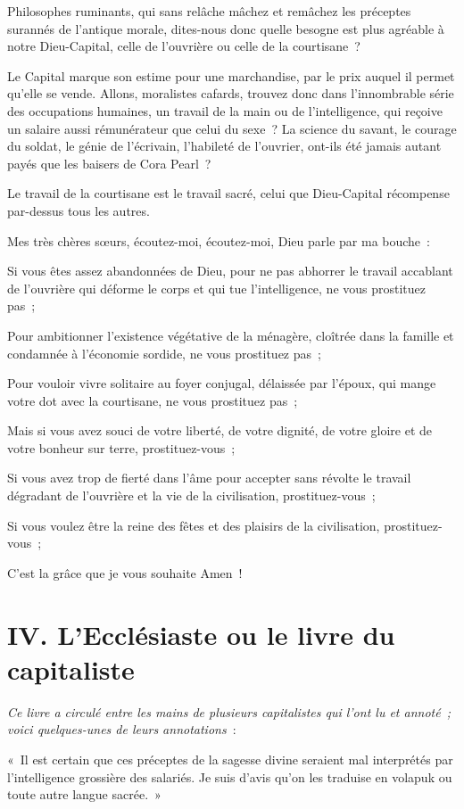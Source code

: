 \documentclass[french,twoside]{book} %
\begin{document}
Philosophes ruminants, qui sans relâche mâchez et remâchez les préceptes surannés de l’antique morale, dites-nous donc quelle besogne est plus agréable à notre Dieu-Capital, celle de l’ouvrière ou celle de la courtisane ?\par
Le Capital marque son estime pour une marchandise, par le prix auquel il permet qu’elle se vende. Allons, moralistes cafards, trouvez donc dans l’innombrable série des occupations humaines, un travail de la main ou de l’intelligence, qui reçoive un salaire aussi rémunérateur que celui du sexe ? La science du savant, le courage du soldat, le génie de l’écrivain, l’habileté de l’ouvrier, ont-ils été jamais autant payés que les baisers de Cora Pearl ?\par
Le travail de la courtisane est le travail sacré, celui que Dieu-Capital récompense par-dessus tous les autres.\par
Mes très chères sœurs, écoutez-moi, écoutez-moi, Dieu parle par ma bouche :\par
Si vous êtes assez abandonnées de Dieu, pour ne pas abhorrer le travail accablant de l’ouvrière qui déforme le corps et qui tue l’intelligence, ne vous prostituez pas ;\par
Pour ambitionner l’existence végétative de la ménagère, cloîtrée dans la famille et condamnée à l’économie sordide, ne vous prostituez pas ;\par
Pour vouloir vivre solitaire au foyer conjugal, délaissée par l’époux, qui mange votre dot avec la courtisane, ne vous prostituez pas ;\par
Mais si vous avez souci de votre liberté, de votre dignité, de votre gloire et de votre bonheur sur terre, prostituez-vous ;\par
Si vous avez trop de fierté dans l’âme pour accepter sans révolte le travail dégradant de l’ouvrière et la vie de la civilisation, prostituez-vous ;\par
Si vous voulez être la reine des fêtes et des plaisirs de la civilisation, prostituez-vous ;\par
C'est la grâce que je vous souhaite Amen !
\section[{IV. L'Ecclésiaste ou le livre du capitaliste}]{IV. L'Ecclésiaste ou le livre du capitaliste}\renewcommand{\leftmark}{IV. L'Ecclésiaste ou le livre du capitaliste}

\noindent \emph{Ce livre a circulé entre les mains de plusieurs capitalistes qui l’ont lu et annoté ; voici quelques-unes de leurs annotations} :\par
« Il est certain que ces préceptes de la sagesse divine seraient mal interprétés par l’intelligence grossière des salariés. Je suis d’avis qu’on les traduise en volapuk ou toute autre langue sacrée. »\par
\end{document}
